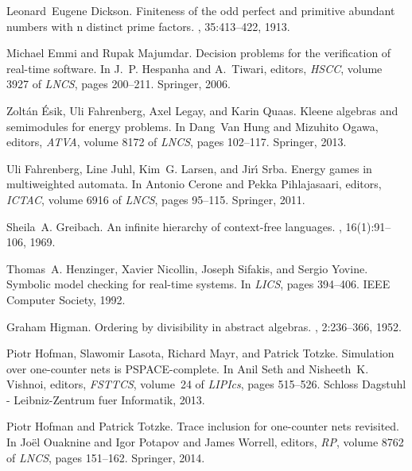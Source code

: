 \documentclass{CSML}
\theoremstyle{plain}\newtheorem{theorem}[thm]{Theorem}
\theoremstyle{plain}\newtheorem{corollary}[thm]{Corollary}
\theoremstyle{plain}\newtheorem{example}[thm]{Example}
\theoremstyle{plain}\newtheorem{lemma}[thm]{Lemma}
\theoremstyle{plain}\newtheorem{remark}[thm]{Remark}
\begin{document}
\begin{thebibliography}{Kos97}
  
Leonard~Eugene Dickson.
\newblock Finiteness of the odd perfect and primitive abundant numbers with n
  distinct prime factors.
, 35:413--422, 1913.

Michael Emmi and Rupak Majumdar.
\newblock Decision problems for the verification of real-time software.
\newblock In J.~P. Hespanha and A.~Tiwari, editors, {\em HSCC}, volume 3927 of
  {\em LNCS}, pages 200--211. Springer, 2006.

Zolt{\'a}n {\'E}sik, Uli Fahrenberg, Axel Legay, and Karin Quaas.
\newblock Kleene algebras and semimodules for energy problems.
\newblock In Dang~Van Hung and Mizuhito Ogawa, editors, {\em ATVA}, volume 8172
  of {\em LNCS}, pages 102--117. Springer, 2013.

Uli Fahrenberg, Line Juhl, Kim~G. Larsen, and Jir\'{\i} Srba.
\newblock Energy games in multiweighted automata.
\newblock In Antonio Cerone and Pekka Pihlajasaari, editors, {\em ICTAC},
  volume 6916 of {\em LNCS}, pages 95--115. Springer, 2011.

Sheila~A. Greibach.
\newblock An infinite hierarchy of context-free languages.
, 16(1):91--106, 1969.

Thomas~A. Henzinger, Xavier Nicollin, Joseph Sifakis, and Sergio Yovine.
\newblock Symbolic model checking for real-time systems.
\newblock In {\em LICS}, pages 394--406. IEEE Computer Society, 1992.

Graham Higman.
\newblock Ordering by divisibility in abstract algebras.
, 2:236--366,
  1952.

Piotr Hofman, Slawomir Lasota, Richard Mayr, and Patrick Totzke.
\newblock Simulation over one-counter nets is {PSPACE}-complete.
\newblock In Anil Seth and Nisheeth~K. Vishnoi, editors, {\em FSTTCS},
  volume~24 of {\em LIPIcs}, pages 515--526. Schloss Dagstuhl - Leibniz-Zentrum
  fuer Informatik, 2013.

Piotr Hofman and Patrick Totzke.
\newblock Trace inclusion for one-counter nets revisited.
\newblock In Jo{\"{e}}l Ouaknine and Igor Potapov and James Worrell, editors, {\em {RP}}, volume 8762 of {\em LNCS}, pages 151--162. Springer, 2014. 


\end{thebibliography}
\end{document}
